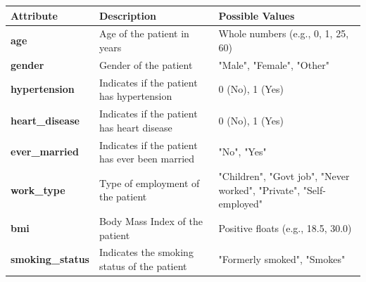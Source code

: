 \documentclass[runningheads]{llncs}
\begin{document}
\begin{enumerate}
\begin{table}[ht]
\begin{tabular}{|l|p{5cm}|p{4cm}|} 
\hline     
\textbf{Attribute} & \textbf{Description} & \textbf{Possible Values} \\        
\hline        
\textbf{age} & Age of the patient in years & Whole numbers (e.g., 0, 1, 25, 60) \\        
\hline        
\textbf{gender} & Gender of the patient & "Male", "Female", "Other" \\        
\hline        
\textbf{hypertension} & Indicates if the patient has hypertension & 0 (No), 1 (Yes) \\        
\hline        
\textbf{heart\_disease} & Indicates if the patient has heart disease & 0 (No), 1 (Yes) \\        
\hline        
\textbf{ever\_married} & Indicates if the patient has ever been married & "No", "Yes" \\        
\hline        
\textbf{work\_type} & Type of employment of the patient & "Children", "Govt job", "Never worked", "Private", "Self-employed" \\        
\hline        
\textbf{bmi} & Body Mass Index of the patient & Positive floats (e.g., 18.5, 30.0) \\        
\hline        
\textbf{smoking\_status} & Indicates the smoking status of the patient & "Formerly smoked", "Smokes" \\        
\hline    
\end{tabular}    
\end{table}


\end{enumerate}
\end{document}
